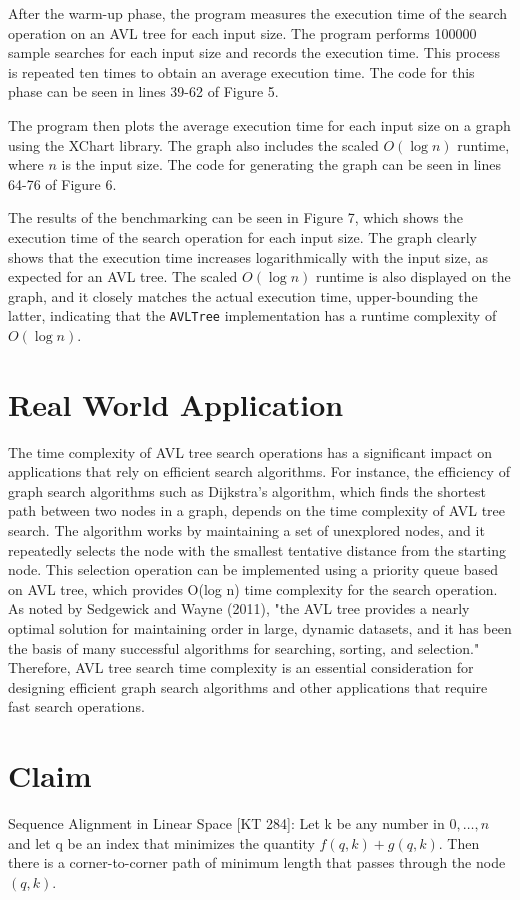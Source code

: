 \documentclass[12pt]{article}
\begin{document}
After the warm-up phase, the program measures the execution time of the search operation on an AVL tree for each input size. The program performs 100000 sample searches for each input size and records the execution time. This process is repeated ten times to obtain an average execution time. The code for this phase can be seen in lines 39-62 of Figure 5.

The program then plots the average execution time for each input size on a graph using the XChart library. The graph also includes the scaled $O(\log n)$ runtime, where $n$ is the input size. The code for generating the graph can be seen in lines 64-76 of Figure 6.

The results of the benchmarking can be seen in Figure 7, which shows the execution time of the search operation for each input size. The graph clearly shows that the execution time increases logarithmically with the input size, as expected for an AVL tree. The scaled $O(\log n)$ runtime is also displayed on the graph, and it closely matches the actual execution time, upper-bounding the latter, indicating that the \texttt{AVLTree} implementation has a runtime complexity of $O(\log n)$.

\section*{Real World Application}
The time complexity of AVL tree search operations has a significant impact on applications that rely on efficient search algorithms. For instance, the efficiency of graph search algorithms such as Dijkstra's algorithm, which finds the shortest path between two nodes in a graph, depends on the time complexity of AVL tree search. The algorithm works by maintaining a set of unexplored nodes, and it repeatedly selects the node with the smallest tentative distance from the starting node. This selection operation can be implemented using a priority queue based on AVL tree, which provides O(log n) time complexity for the search operation. As noted by Sedgewick and Wayne (2011), "the AVL tree provides a nearly optimal solution for maintaining order in large, dynamic datasets, and it has been the basis of many successful algorithms for searching, sorting, and selection." Therefore, AVL tree search time complexity is an essential consideration for designing efficient graph search algorithms and other applications that require fast search operations.

\clearpage
\section*{Claim}
Sequence Alignment in Linear Space [KT 284]: Let k be any number in ${0, \dots, n}$ and let q be an index that minimizes the quantity $f(q,k) + g(q,k)$. Then there is a corner-to-corner path of minimum length that passes through the node $(q,k)$.
\end{document}
